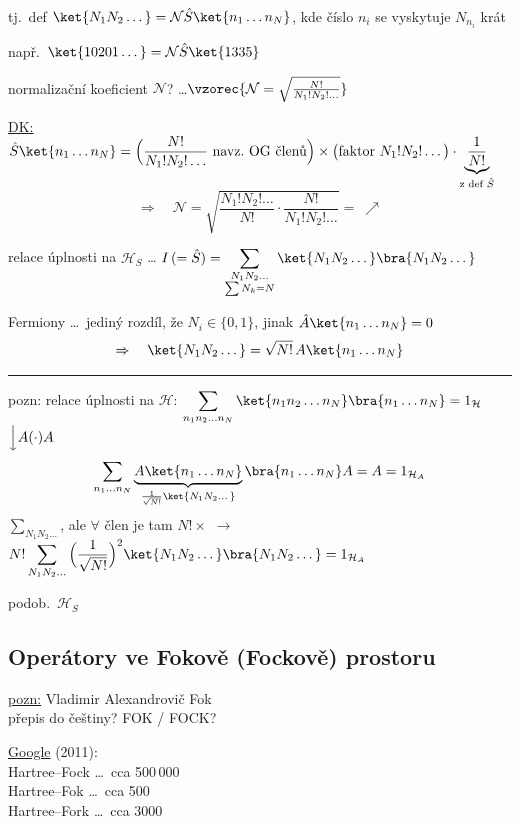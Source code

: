 \begin{definice}
tj.\ def \quad $\ket{N_1N_2\dots} = \mathcal{N}\hat S\ket{n_1\dots n_N}$, \quad kde číslo $n_i$ se vyskytuje $N_{n_i}$ krát
\end{definice}

např.\ \quad $\ket{10201\dots} = \mathcal{N}\hat S\ket{1335}$ \quad {}

normalizační koeficient $\mathcal{N}$? \quad \dots \quad $\vzorec{\mathcal{N} = \sqrt{\frac{N!}{N_1!N_2!\dots}}}$

\underline{DK:} \quad
$\hat S\ket{n_1\dots n_N} = \Big(\dfrac{N!}{N_1!N_2!\dots}\ \text{navz.\ OG členů}\Big)\times\big(\text{faktor } N_1!N_2!\dots\big)\cdot\underbrace{\dfrac{1}{N!}}_{\text{z def } \hat S}$
\[
  \Rightarrow\quad \mathcal{N} = \sqrt{\frac{N_1!N_2!\dots}{N!}\cdot\frac{N!}{N_1!N_2!\dots}} = \ \nearrow
\]

relace úplnosti na $\mathcal{H}_S$ \dots \quad
$I\,(=\hat S) = \displaystyle\sum_{\substack{N_1N_2\dots \\ \sum N_k = N}}\ket{N_1N_2\dots}\bra{N_1N_2\dots}$

Fermiony \dots\ jediný rozdíl, že $N_i\in\{0,1\}$, jinak $\hat A\ket{n_1\dots n_N} = 0$
\[
  \Rightarrow\quad \ket{N_1N_2\dots} = \sqrt{N!}\,A\ket{n_1\dots n_N}
\]
\hrule\smallskip

pozn: relace úplnosti na $\mathcal{H}$: \quad
$\displaystyle\sum_{n_1n_2\dots n_N}\ket{n_1n_2\dots n_N}\bra{n_1\dots n_N} = 1_{\mathcal{H}}$ \quad $\Big\downarrow A(\cdot)A$
\[
  \sum_{n_1\dots n_N}\underbrace{A\ket{n_1\dots n_N}}_{\frac{1}{\sqrt{N!}}\ket{N_1N_2\dots}}\bra{n_1\dots n_N}A = A = 1_{\mathcal{H}_A}
\]
$\sum_{N_1N_2\dots}$, ale $\forall$ člen je tam $N!\times$ \quad $\to$ \quad
$N!\displaystyle\sum_{N_1N_2\dots}\Big(\frac{1}{\sqrt{N!}}\Big)^2\ket{N_1N_2\dots}\bra{N_1N_2\dots} = 1_{\mathcal{H}_A}$

podob.\ $\mathcal{H}_S$

\subsection*{Operátory ve Fokově (Fockově) prostoru}
\begin{minipage}{0.55\textwidth}
\underline{pozn:} Vladimir Alexandrovič Fok  \\
přepis do češtiny? FOK / FOCK?
\end{minipage}
\begin{minipage}{0.43\textwidth}
\underline{Google} (2011): \\
Hartree--Fock \dots\ cca 500\,000 \\
Hartree--Fok \dots\ cca 500 \\
Hartree--Fork \dots\ cca 3000
\end{minipage}

